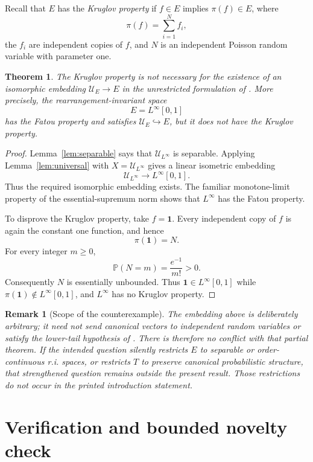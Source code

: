 \documentclass[11pt]{article}
\newtheorem{theorem}{Theorem}
\newtheorem{remark}{Remark}
\newcommand{\U}{\mathcal U}
\newcommand{\subsetsim}{\mathrel{\hookrightarrow}}
\begin{document}
Recall that $E$ has the \emph{Kruglov property} if $f\in E$ implies
$\pi(f)\in E$, where
\[
                    \pi(f)=\sum_{i=1}^{N}f_i,
\]
the $f_i$ are independent copies of $f$, and $N$ is an independent Poisson
random variable with parameter one.

\begin{theorem}\label{thm:main}
The Kruglov property is not necessary for the existence of an isomorphic
embedding $\U_E\to E$ in the unrestricted formulation of
\cite{AC2022}. More precisely, the rearrangement-invariant space
\[
                           E=L^\infty[0,1]
\]
has the Fatou property and satisfies $\U_E\subsetsim E$, but it does not have
the Kruglov property.
\end{theorem}

\begin{proof}
Lemma~\ref{lem:separable} says that $\U_{L^\infty}$ is separable. Applying
Lemma~\ref{lem:universal} with $X=\U_{L^\infty}$ gives a linear isometric
embedding
\[
                    \U_{L^\infty}\longrightarrow L^\infty[0,1].
\]
Thus the required isomorphic embedding exists. The familiar monotone-limit
property of the essential-supremum norm shows that $L^\infty$ has the Fatou
property.

To disprove the Kruglov property, take $f=\mathbf1$. Every independent copy
of $f$ is again the constant one function, and hence
\[
                         \pi(\mathbf1)=N.
\]
For every integer $m\ge0$,
\[
                         \mathbb P(N=m)=\frac{e^{-1}}{m!}>0.
\]
Consequently $N$ is essentially unbounded. Thus
$\mathbf1\in L^\infty[0,1]$ while
$\pi(\mathbf1)\notin L^\infty[0,1]$, and $L^\infty$ has no Kruglov
property.
\end{proof}

\begin{remark}[Scope of the counterexample]
The embedding above is deliberately arbitrary; it need not send canonical
vectors to independent random variables or satisfy the lower-tail hypothesis
of \cite[Theorem~6]{AC2022}. There is therefore no conflict with that partial
theorem. If the intended question silently restricts $E$ to separable or
order-continuous r.i. spaces, or restricts $T$ to preserve canonical
probabilistic structure, that strengthened question remains outside the
present result. Those restrictions do not occur in the printed introduction
statement.
\end{remark}

\section{Verification and bounded novelty check}
\end{document}
